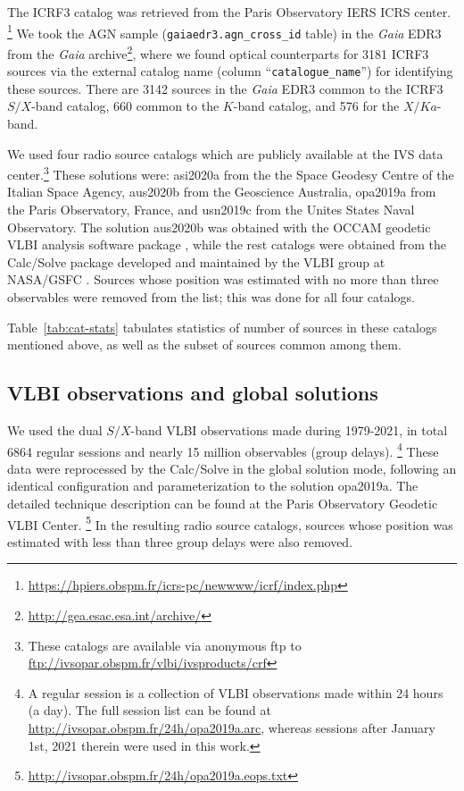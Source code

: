 \documentclass{aa}
\begin{document}
    The ICRF3 catalog \citep{2020A&A...644A.159C} was retrieved from the Paris Observatory IERS ICRS center. \footnote{\url{https://hpiers.obspm.fr/icrs-pc/newwww/icrf/index.php}}
    We took the AGN sample (\texttt{gaiaedr3.agn\_cross\_id} table) in the \textit{Gaia} EDR3 from the \textit{Gaia} archive\footnote{\url{http://gea.esac.esa.int/archive/}}, where we found optical counterparts for 3181 ICRF3 sources via the external catalog name (column ``\texttt{catalogue\_name}'') for identifying these sources.
    There are 3142 sources in the \textit{Gaia} EDR3 common to the ICRF3 $S/X$-band catalog, 660 common to the $K$-band catalog, and 576 for the $X/Ka$-band.
    
    We used four radio source catalogs which are publicly available at the IVS data center.\footnote{These catalogs are available via anonymous ftp to \url{ftp://ivsopar.obspm.fr/vlbi/ivsproducts/crf}}
    These solutions were: asi2020a from the the Space Geodesy Centre of the Italian Space Agency, aus2020b from the Geoscience Australia, opa2019a from the Paris Observatory, France, and usn2019c from the Unites States Naval Observatory.
    The solution aus2020b was obtained with the OCCAM geodetic VLBI analysis software package \citep{2004ivsg.conf..267T}, while the rest catalogs were obtained from the Calc/Solve package developed and maintained by the VLBI group at NASA/GSFC \citep{1986AJ.....92.1020M}.
    Sources whose position was estimated with no more than three observables were removed from the list; this was done for all four catalogs.
    
    Table~\ref{tab:cat-stats} tabulates statistics of number of sources in these catalogs mentioned above, as well as the subset of sources common among them.


\subsection{VLBI observations and global solutions}  \label{subsec:vlbi-data}

    We used the dual $S/X$-band VLBI observations made during 1979-2021, in total 6864 regular sessions and nearly 15 million observables (group delays). \footnote{A regular session is a collection of VLBI observations made within 24 hours (a day). The full session list can be found at \url{http://ivsopar.obspm.fr/24h/opa2019a.arc}, whereas sessions after January 1st, 2021 therein were used in this work.}
    These data were reprocessed by the Calc/Solve in the global solution mode, following an identical configuration and parameterization to the solution opa2019a.
    The detailed technique description can be found at the Paris Observatory Geodetic VLBI Center. \footnote{\url{http://ivsopar.obspm.fr/24h/opa2019a.eops.txt}}
    In the resulting radio source catalogs, sources whose position was estimated with less than three group delays were also removed.
\end{document}
